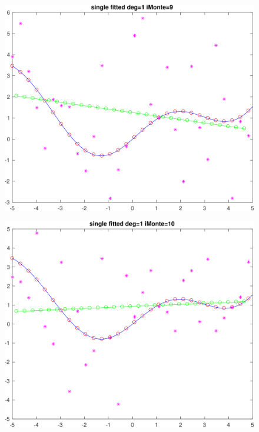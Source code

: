 \documentclass[11pt]{article}
\begin{document}
\begin{figure}[h!]
\centering\includegraphics[scale=0.1]{single_poly_d_1_iMonte_9.png}
\end{figure}


\begin{figure}[h!]
\centering\includegraphics[scale=0.1]{single_poly_d_1_iMonte_10.png}
\end{figure}
\end{document}
